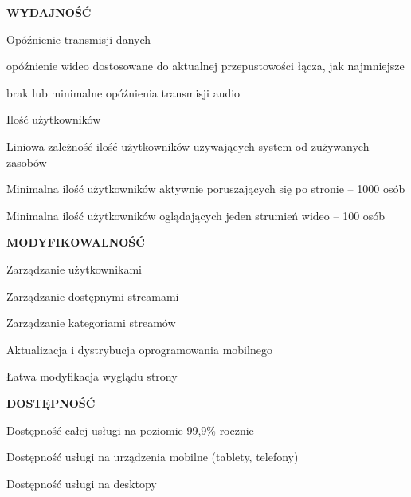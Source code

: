 \begin{packed_item}
    \item{
        \textbf{WYDAJNOŚĆ}
        \begin{packed_item}
            \item{
                Opóźnienie transmisji danych
                \begin{packed_item}
                    \item{opóźnienie wideo dostosowane do aktualnej przepustowości łącza, jak najmniejsze}
                    \item{brak lub minimalne opóźnienia transmisji audio}
                \end{packed_item}
            }
            \item{
                Ilość użytkowników
                \begin{packed_item}
                    \item{Liniowa zależność ilość użytkowników używających system od zużywanych zasobów}
                    \item{Minimalna ilość użytkowników aktywnie poruszających się po stronie -- 1000 osób}
                    \item{Minimalna ilość użytkowników oglądających jeden strumień wideo -- 100 osób}
                \end{packed_item}
            }
        \end{packed_item}
    }
    \item{
        \textbf{MODYFIKOWALNOŚĆ}
        \begin{packed_item}
            \item{Zarządzanie użytkownikami}
            \item{Zarządzanie dostępnymi streamami}
            \item{Zarządzanie kategoriami streamów}
            \item{Aktualizacja i dystrybucja oprogramowania mobilnego}
            \item{Łatwa modyfikacja wyglądu strony}
        \end{packed_item}
    }
    \item{
        \textbf{DOSTĘPNOŚĆ}
        \begin{packed_item}
            \item{Dostępność całej usługi na poziomie 99,9\% rocznie}
            \item{Dostępność usługi na urządzenia mobilne (tablety, telefony)}
            \item{Dostępność usługi na desktopy}

\end{packed_item}}
\end{packed_item}
